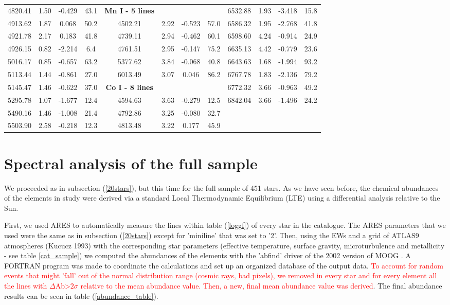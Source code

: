 \documentclass[dvips,12pt,a4paper]{report}
\begin{document}
{{\begin{table}[h]
\begin{tabular}{c c c c | c c c c | c c c c}
4820.41 & 1.50 & -0.429 &  43.1 & \textbf{Mn I - 5 lines} & &  &  & 6532.88 & 1.93 & -3.418 &  15.8 \\
4913.62 & 1.87 &  0.068 &  50.2 & 4502.21 & 2.92 & -0.523 &  57.0 & 6586.32 & 1.95 & -2.768 &  41.8 \\
4921.78 & 2.17 &  0.183 &  41.8 & 4739.11 & 2.94 & -0.462 &  60.1 & 6598.60 & 4.24 & -0.914 &  24.9 \\
4926.15 & 0.82 & -2.214 &   6.4 & 4761.51 & 2.95 & -0.147 &  75.2 & 6635.13 & 4.42 & -0.779 &  23.6 \\
5016.17 & 0.85 & -0.657 &  63.2 & 5377.62 & 3.84 & -0.068 &  40.8 & 6643.63 & 1.68 & -1.994 &  93.2 \\
5113.44 & 1.44 & -0.861 &  27.0 & 6013.49 & 3.07 &  0.046 &  86.2 & 6767.78 & 1.83 & -2.136 &  79.2 \\
5145.47 & 1.46 & -0.622 &  37.0 & \textbf{Co I - 8 lines} &  & &  & 6772.32 & 3.66 & -0.963 &  49.2 \\
5295.78 & 1.07 & -1.677 &  12.4 & 4594.63 & 3.63 & -0.279 &  12.5 & 6842.04 & 3.66 & -1.496 &  24.2 \\
5490.16 & 1.46 & -1.008 &  21.4 & 4792.86 & 3.25 & -0.080 &  32.7 \\ 
5503.90 & 2.58 & -0.218 &  12.3 & 4813.48 & 3.22 &  0.177 &  45.9 \\
\hline
\end{tabular}
\end {table}

\section {Spectral analysis of the full sample}

We proceeded as in subsection (\ref{20stars}), but this time for the full sample of 451 stars. As we have seen before, the chemical abundances of the elements in study were derived via a standard Local Thermodynamic Equilibrium (LTE) using a  differential analysis relative to the Sun. 

First, we used ARES to automatically measure the lines within table (\ref{loggf}) of every star in the catalogue. The ARES parameters that we used were the same as in subsection (\ref{20stars}) except for 'miniline' that was set to '2'. Then, using the EWs and a grid of ATLAS9 atmospheres (Kucucz 1993) with the corresponding star parameters (effective temperature, surface gravity, microturbulence and metallicity - see table \ref{cat_sample}) we computed the abundances of the elements with the 'abfind' driver of the 2002 version of MOOG \citep{Sneden-1973}. A FORTRAN program was made to coordinate the calculations and set up an organized database of the output data. \textcolor{red}{To account for random events that might 'fall' out of the normal distribution range (cosmic rays, bad pixels), we removed in every star and for every element all the lines with $\Delta$Ab>$2\sigma$ relative to the mean abundance value. Then, a new, final mean abundance value was derived}. The final abundance results can be seen in table (\ref{abundance_table}). 

}}
\end{document}
